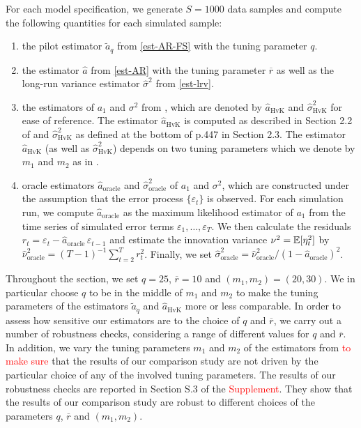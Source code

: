 For each model specification, we generate $S=1000$ data samples and compute the following quantities for each simulated sample: 
\begin{enumerate}[label=(\roman*),leftmargin=0.9cm]
\item the pilot estimator $\widetilde{a}_q$ from \eqref{est-AR-FS} with the tuning parameter $q$.
\item the estimator $\widehat{a}$ from \eqref{est-AR} with the tuning parameter $\overline{r}$ as well as the long-run variance estimator $\widehat{\sigma}^2$ from \eqref{est-lrv}. 
\item the estimators of $a_1$ and $\sigma^2$ from \cite{Hall2003}, which are denoted by $\widehat{a}_{\text{HvK}}$ and $\widehat{\sigma}^2_{\text{HvK}}$ for ease of reference. The estimator $\widehat{a}_{\text{HvK}}$ is computed as described in Section 2.2 of \cite{Hall2003} and $\widehat{\sigma}^2_{\text{HvK}}$ as defined at the bottom of p.447 in Section 2.3. The estimator $\widehat{a}_{\text{HvK}}$ (as well as $\widehat{\sigma}^2_{\text{HvK}}$) depends on two tuning parameters which we denote by $m_1$ and $m_2$ as in \cite{Hall2003}. 
\item oracle estimators $\widehat{a}_{\text{oracle}}$ and $\widehat{\sigma}^2_{\text{oracle}}$ of $a_1$ and $\sigma^2$, which are constructed under the assumption that the error process $\{\varepsilon_t\}$ is observed. For each simulation run, we compute $\widehat{a}_{\text{oracle}}$ as the maximum likelihood estimator of $a_1$ from the time series of simulated error terms $\varepsilon_1,\ldots,\varepsilon_T$. We then calculate the residuals $r_t = \varepsilon_t - \widehat{a}_{\text{oracle}} \, \varepsilon_{t-1}$ and estimate the innovation variance $\nu^2 = \mathbb{E}[\eta_t^2]$ by $\widehat{\nu}_{\text{oracle}}^2 = (T-1)^{-1} \sum_{t=2}^T r_t^2$. Finally, we set $\widehat{\sigma}^2_{\text{oracle}} = \widehat{\nu}_{\text{oracle}}^2 / (1 - \widehat{a}_{\text{oracle}})^2$. 
\end{enumerate}
Throughout the section, we set $q = 25$, $\overline{r} = 10$ and $(m_1,m_2) = (20,30)$. We in particular choose $q$ to be in the middle of $m_1$ and $m_2$ to make the tuning parameters of the estimators $\widetilde{a}_q$ and $\widehat{a}_{\text{HvK}}$ more or less comparable. In order to assess how sensitive our estimators are to the choice of $q$ and $\overline{r}$, we carry out a number of robustness checks, considering a range of different values for $q$ and $\overline{r}$. In addition, we vary the tuning parameters $m_1$ and $m_2$ of the estimators from \cite{Hall2003} \textcolor{red}{to make sure} that the results of our comparison study are not driven by the particular choice of any of the involved tuning parameters. The results of our robustness checks are reported in Section S.3 of the \textcolor{red}{Supplement}. They show that the results of our comparison study are robust to %
different choices of the parameters $q$, $\overline{r}$ and $(m_1,m_2)$. %



